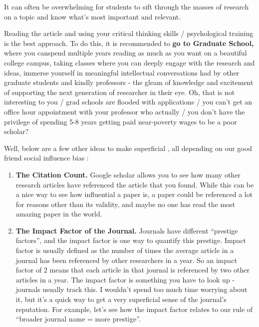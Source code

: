 \documentclass[
  letterpaper,
  DIV=11,
  numbers=noendperiod,
  oneside]{scrreprt}
\begin{document}
It can often be overwhelming for students to sift through the masses of
research on a topic and know what's most important and relevant.~

Reading the article and using your critical thinking skills /
psychological training is the best approach. To do this, it is
recommended to \textbf{go to Graduate School,} where you canspend
multiple years reading as much as you want on a beautiful college
campus, taking classes where you can deeply engage with the research and
ideas, immerse yourself in meaningful intellectual conversations had by
other graduate students and kindly professors - the gleam of knowledge
and excitement of supporting the next generation of researcher in their
eye. Oh, that is not interesting to you / grad schools are flooded with
applications / you can't get an office hour appointment with your
professor who actually / you don't have the privilege of spending 5-8
years getting paid near-poverty wages to be a poor scholar?~

Well, below are a few other ideas to make superficial , all depending on
our good friend social influence bias :

\begin{enumerate}
\def\labelenumi{\arabic{enumi}.}
\item
  \textbf{The Citation Count.} Google scholar allows you to see how many
  other research articles have referenced the article that you found.
  While this can be a nice way to see how influential a paper is, a
  paper could be referenced a lot for reasons other than its validity,
  and maybe no one has read the most amazing paper in the world.
\item
  \textbf{The Impact Factor of the Journal.} Journals have different
  ``prestige factors'', and the impact factor is one way to quantify
  this prestige. Impact factor is usually defined as the number of times
  the average article in a journal has been referenced by other
  researchers in a year. So an impact factor of 2 means that each
  article in that journal is referenced by two other articles in a year.
  The impact factor is something you have to look up - journals usually
  track this. I wouldn't spend too much time worrying about it, but it's
  a quick way to get a very superficial sense of the journal's
  reputation. For example, let's see how the impact factor relates to
  our rule of ``broader journal name = more prestige''.
\end{enumerate}
\end{document}
